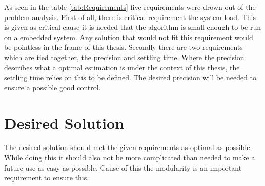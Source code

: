  As seen in the table \ref{tab:Requirements} five requirements were drown out of the problem analysis. 
 First of all, there is critical requirement the system load. This is given as critical cause it is needed that the algorithm is small enough to be run on a embedded system.
 Any solution that would not fit this requirement would be pointless in the frame of this thesis.
 Secondly there are two requirements which are tied together, the precision and settling time.
 Where the precision describes what a optimal estimation is under the context of this thesis, the settling time relies on this to be defined.
 The desired precision will be needed to ensure a possible good control.
 
 \section{Desired Solution}
 The desired solution should met the given requirements as optimal as possible. While doing this it should also not be more complicated than needed
 to make a future use as easy as possible. Cause of this the modularity is an important requirement to ensure this.
